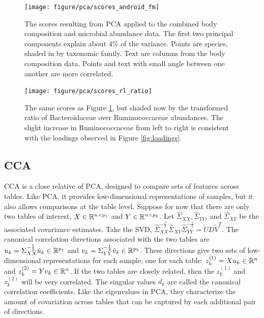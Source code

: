 \documentclass{article}
\begin{document}
\begin{figure}
  \centering
  \texttt{[image: figure/pca/scores\_android\_fm]}
  \caption{The scores resulting from PCA applied to the combined body
    composition and microbial abundance data. The first two principal
    components explain about 4\% of the variance. Points are species, shaded in
    by taxonomic family. Text are columns from the body composition data. Points
    and text with small angle between one another are more correlated.
    \label{fig:scores_android_fm} }
\end{figure}

\begin{figure}
  \centering
  \texttt{[image: figure/pca/scores\_rl\_ratio]}
  \caption{The same scores as Figure \ref{fig:scores_android_fm}, but shaded now
    by the transformed ratio of Bacteroidaceae over Ruminococcaceae abundances.
    The slight increase in Ruminococcaceae from left to right is consistent with
    the loadings observed in Figure
    \ref{fig:loadings}.\label{fig:scores_rl_ratio} }
\end{figure}

\subsection{CCA}
\label{subsec:cca}

CCA is a close relative of PCA, designed to compare sets of features across
tables. Like PCA, it provides low-dimensional representations of samples, but it
also allows comparisons at the table level. Suppose for now that there are only
two tables of interest, $X \in \mathbb{R}^{n \times p_{1}}$ and $Y \in \mathbb{R}^{n
  \times p_{2}}$. Let $\hat{\Sigma}_{XX}, \hat{\Sigma}_{YY}$, and
$\hat{\Sigma}_{XY}$ be the associated covariance estimates. Take the SVD,
$\hat{\Sigma}_{XX}^{-\frac{1}{2}}\hat{\Sigma}_{XY}\hat{\Sigma}_{YY}^{-\frac{1}{2}}
= \tilde{U}D\tilde{V}^{T}$. The canonical correlation directions associated with
the two tables are $u_{k} = \Sigma_{XX}^{-\frac{1}{2}}\tilde{u}_{k} \in
\mathbb{R}^{p_{1}}$ and $v_{k} = \Sigma_{YY}^{-\frac{1}{2}}\tilde{v}_{k} \in
\mathbb{R}^{p_{2}}$. These directions give two sets of low-dimensional
representations for each sample, one for each table: $z_{k}^{(1)} = Xu_{k} \in
\mathbb{R}^{n}$ and $z_{k}^{(2)} = Yv_{k} \in \mathbb{R}^{n}$. If the two tables are
closely related, then the $z_{k}^{(1)}$ and $z_{k}^{(2)}$ will be very
correlated. The singular values $d_{k}$ are called the canonical correlation
coefficients. Like the eigenvalues in PCA, they characterize the amount of
covariation across tables that can be captured by each additional pair of
directions.
\end{document}
